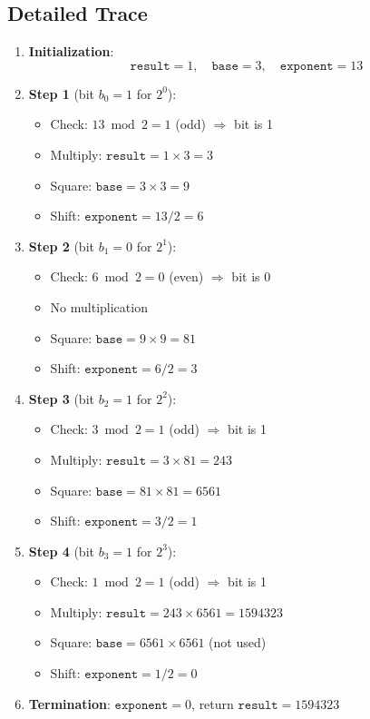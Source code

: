 \documentclass{article}
\begin{document}
	\subsection{Detailed Trace}
	
	\begin{enumerate}[leftmargin=*]
		\item \textbf{Initialization}: 
		\[\texttt{result} = 1, \quad \texttt{base} = 3, \quad \texttt{exponent} = 13\]
		
		\item \textbf{Step 1} (bit $b_0 = 1$ for $2^0$):
		\begin{itemize}
			\item Check: $13 \bmod 2 = 1$ (odd) $\Rightarrow$ bit is 1
			\item Multiply: $\texttt{result} = 1 \times 3 = 3$
			\item Square: $\texttt{base} = 3 \times 3 = 9$
			\item Shift: $\texttt{exponent} = 13 / 2 = 6$
		\end{itemize}
		
		\item \textbf{Step 2} (bit $b_1 = 0$ for $2^1$):
		\begin{itemize}
			\item Check: $6 \bmod 2 = 0$ (even) $\Rightarrow$ bit is 0
			\item No multiplication
			\item Square: $\texttt{base} = 9 \times 9 = 81$
			\item Shift: $\texttt{exponent} = 6 / 2 = 3$
		\end{itemize}
		
		\item \textbf{Step 3} (bit $b_2 = 1$ for $2^2$):
		\begin{itemize}
			\item Check: $3 \bmod 2 = 1$ (odd) $\Rightarrow$ bit is 1
			\item Multiply: $\texttt{result} = 3 \times 81 = 243$
			\item Square: $\texttt{base} = 81 \times 81 = 6561$
			\item Shift: $\texttt{exponent} = 3 / 2 = 1$
		\end{itemize}
		
		\item \textbf{Step 4} (bit $b_3 = 1$ for $2^3$):
		\begin{itemize}
			\item Check: $1 \bmod 2 = 1$ (odd) $\Rightarrow$ bit is 1
			\item Multiply: $\texttt{result} = 243 \times 6561 = 1594323$
			\item Square: $\texttt{base} = 6561 \times 6561$ (not used)
			\item Shift: $\texttt{exponent} = 1 / 2 = 0$
		\end{itemize}
		
		\item \textbf{Termination}: $\texttt{exponent} = 0$, return $\texttt{result} = 1594323$
	\end{enumerate}
	
\end{document}
